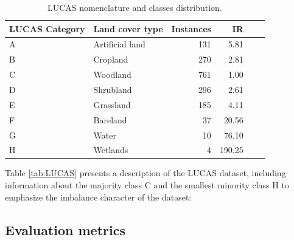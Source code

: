 \documentclass[remotesensing,article,submit,moreauthors,pdftex]{Definitions/mdpi}
\begin{document}
\begin{table}[H]
	\centering
	\begin{tabular}{llrrrr}
		\toprule
		\textbf{LUCAS Category} & \textbf{Land cover type} & \textbf{Instances}
		                        &\textbf{IR} \\
		\hline
		A                       & Artificial land          & 131                
		& 5.81   \\
		B                       & Cropland                 & 270                
		& 2.81   \\
		C                       & Woodland                 & 761                
		& 1.00   \\
		D                       & Shrubland                & 296                
		& 2.61   \\
		E                       & Grassland                & 185                
		& 4.11   \\
		F                       & Bareland                 & 37                 
		& 20.56  \\
		G                       & Water                    & 10                 
		& 76.10  \\
		H                       & Wetlands                 & 4                  
		& 190.25 \\
		\bottomrule
	\end{tabular}
	\caption{\label{tab:classes_distribution}LUCAS nomenclature and classes 
	distribution.}
\end{table}

Table \ref{tab:LUCAS} presents a description of the LUCAS dataset, including
information about the majority class C and the smallest minority class H to
emphasize the imbalance character of the dataset:


\subsection{Evaluation metrics}  \label{Evaluation metrics}
\end{document}
